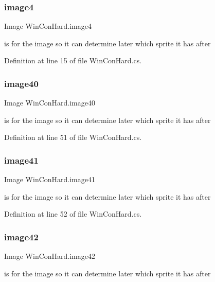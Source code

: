 \subsubsection{\texorpdfstring{image4}{image4}}
{\footnotesize\ttfamily Image Win\+Con\+Hard.\+image4}

is for the image so it can determine later which sprite it has after 

Definition at line 15 of file Win\+Con\+Hard.\+cs.

\mbox{\label{class_win_con_hard_acd1a93ee7e72b9c7b7f51ed639d24d98}} 
\subsubsection{\texorpdfstring{image40}{image40}}
{\footnotesize\ttfamily Image Win\+Con\+Hard.\+image40}

is for the image so it can determine later which sprite it has after 

Definition at line 51 of file Win\+Con\+Hard.\+cs.

\mbox{\label{class_win_con_hard_ab39f0eee62ffcca5d594221a566c8375}} 
\subsubsection{\texorpdfstring{image41}{image41}}
{\footnotesize\ttfamily Image Win\+Con\+Hard.\+image41}

is for the image so it can determine later which sprite it has after 

Definition at line 52 of file Win\+Con\+Hard.\+cs.

\mbox{\label{class_win_con_hard_a88eca52625dbe9a307c9ffc362f29349}} 
\subsubsection{\texorpdfstring{image42}{image42}}
{\footnotesize\ttfamily Image Win\+Con\+Hard.\+image42}

is for the image so it can determine later which sprite it has after 

